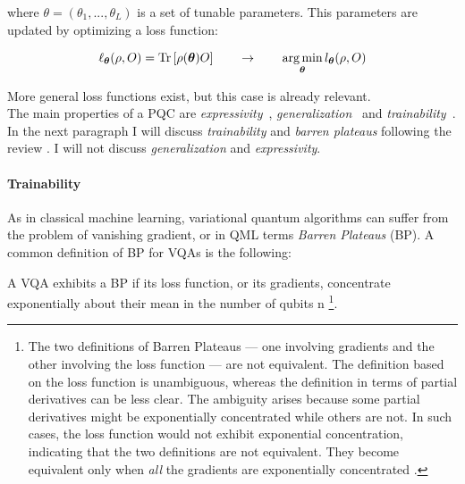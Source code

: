 where $\theta = (\theta_1, ..., \theta_L)$ is a set of tunable parameters.
This parameters are updated by optimizing a loss function:


\begin{align}
    \ell_{\bm{\theta}}(\rho, O) = \text{Tr}\left[\rho(\bm{\theta})O\right]
    \qquad
    \rightarrow
    \qquad
    \operatorname*{arg\,min}_{\bm{\theta}} l_{\bm{\theta}}(\rho, O)
    \label{eq:loss-function-vqa}
\end{align}



More general loss functions exist, but this case is already relevant.\\
The main properties of a PQC are \textit{expressivity}~\cite{hubregtsen2020, Sim_2019, Bravo_Prieto_2020, 
Wu_2021, Herman_2023, Haug_2021, Holmes_2022}, \textit{generalization}~\cite{Caro_2020, Abbas_2021, Banchi_2021,
Bu_2023, bu2021, Bu_2022, Du_2022, Peters_2023, Caro_2023} and \textit{trainability}~\cite{McClean_2018, 
Cerezo_2021, Arrasmith_2021, Kim_2021, Wang_2021, Pesah_2021, marrero2021, Larocca_2023}.\\

In the next paragraph I will discuss \textit{trainability} and \textit{barren plateaus} following the 
review \cite{larocca2024reviewbarrenplateausvariational}.
I will not discuss \textit{generalization} and \textit{expressivity}.

\paragraph{Trainability}

As in classical machine learning, variational quantum algorithms can suffer from the problem of vanishing 
gradient, or in QML terms \textit{Barren Plateaus} (BP).
A common definition of BP for VQAs is the following:

\begin{defn*}
    A VQA exhibits a BP if its loss function, or its gradients, concentrate exponentially about their mean 
    in the number of qubits n
    \footnote[1]{The two definitions of Barren Plateaus — one involving gradients and the other 
    involving the loss function — are not equivalent. The definition based on the loss function is 
    unambiguous, whereas the definition in terms of partial derivatives can be less clear. The ambiguity 
    arises because some partial derivatives might be exponentially concentrated while others are not. In such 
    cases, the loss function would not exhibit exponential concentration, indicating that the two definitions 
    are not equivalent. They become equivalent only when \textit{all} the gradients are exponentially concentrated 
    \cite{Arrasmith_2022}.}.
\end{defn*}

